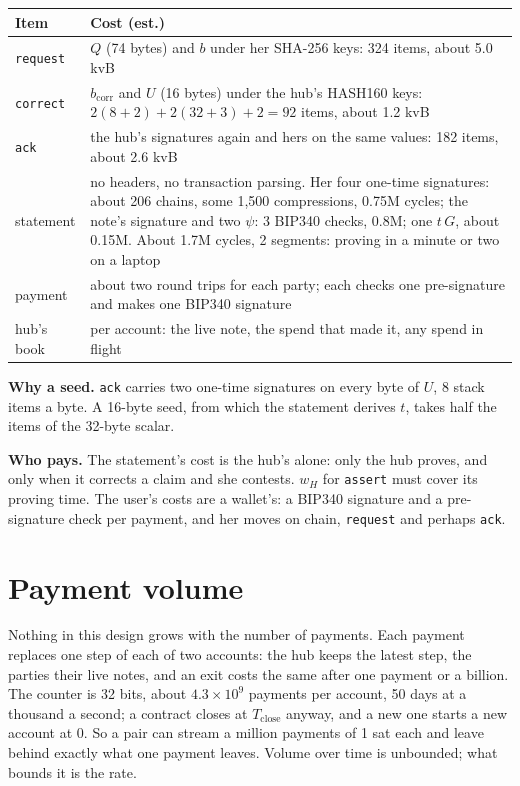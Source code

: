 \documentclass[11pt]{article}
\theoremstyle{plain}
\theoremstyle{definition}
\newcommand{\Tc}{T_{\mathrm{close}}}
\newcommand{\bcorr}{b_{\mathrm{corr}}}
\newcommand{\tx}[1]{\texttt{#1}}
\begin{document}
\begin{center}
\begin{tabularx}{\linewidth}{lL}
\toprule
Item & Cost (est.) \\
\midrule
\tx{request} & $Q$ (74 bytes) and $b$ under her SHA-256 keys: 324 items, about 5.0 kvB \\
\tx{correct} & $\bcorr$ and $U$ (16 bytes) under the hub's HASH160 keys: $2(8 + 2) + 2(32 + 3) + 2 = 92$ items, about 1.2 kvB \\
\tx{ack} & the hub's signatures again and hers on the same values: 182 items, about 2.6 kvB \\
statement & no headers, no transaction parsing. Her four one-time signatures: about 206 chains, some 1,500 compressions, 0.75M cycles; the note's signature and two $\psi$: 3 BIP340 checks, 0.8M; one $t\,G$, about 0.15M. About 1.7M cycles, 2 segments: proving in a minute or two on a laptop \\
payment & about two round trips for each party; each checks one pre-signature and makes one BIP340 signature \\
hub's book & per account: the live note, the spend that made it, any spend in flight \\
\bottomrule
\end{tabularx}
\end{center}

\textbf{Why a seed.} \tx{ack} carries two one-time signatures on every
byte of $U$, 8 stack items a byte. A 16-byte seed, from which the
statement derives $t$, takes half the items of the 32-byte scalar.

\textbf{Who pays.} The statement's cost is the hub's alone: only the
hub proves, and only when it corrects a claim and she contests. $w_H$
for \tx{assert} must cover its proving time. The user's costs are a
wallet's: a BIP340 signature and a pre-signature check per payment, and
her moves on chain, \tx{request} and perhaps \tx{ack}.

\section{Payment volume}\label{sec:volume-pay}

Nothing in this design grows with the number of payments. Each payment
replaces one step of each of two accounts: the hub keeps the latest
step, the parties their live notes, and an exit costs the same after
one payment or a billion. The counter is 32 bits, about $4.3 \times
10^9$ payments per account, 50 days at a thousand a second; a contract
closes at $\Tc$ anyway, and a new one starts a new account at 0. So a
pair can stream a million payments of 1 sat each and leave behind
exactly what one payment leaves. Volume over time is unbounded; what
bounds it is the rate.
\end{document}
